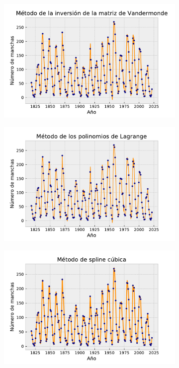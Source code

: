 \documentclass[../portafolio.tex]{subfiles}
\begin{document}
\begin{figure}[H]
    \centering
    \begin{subfigure}[b]{0.49\textwidth}
        \centering
        \includegraphics[width=\textwidth]{tex/img/vandermonde.pdf}
        \caption{}
        \label{vanderm}
    \end{subfigure}
    \hfill
    \begin{subfigure}[b]{0.49\textwidth}
        \centering
        \includegraphics[width=\textwidth]{tex/img/lagrange1.pdf}
        \caption{}
        \label{lagr1}
    \end{subfigure}
    \hfill
    \begin{subfigure}[b]{0.49\textwidth}
         \centering
         \includegraphics[width=\textwidth]{tex/img/sp.pdf}

\end{subfigure}
\end{figure}
\end{document}
